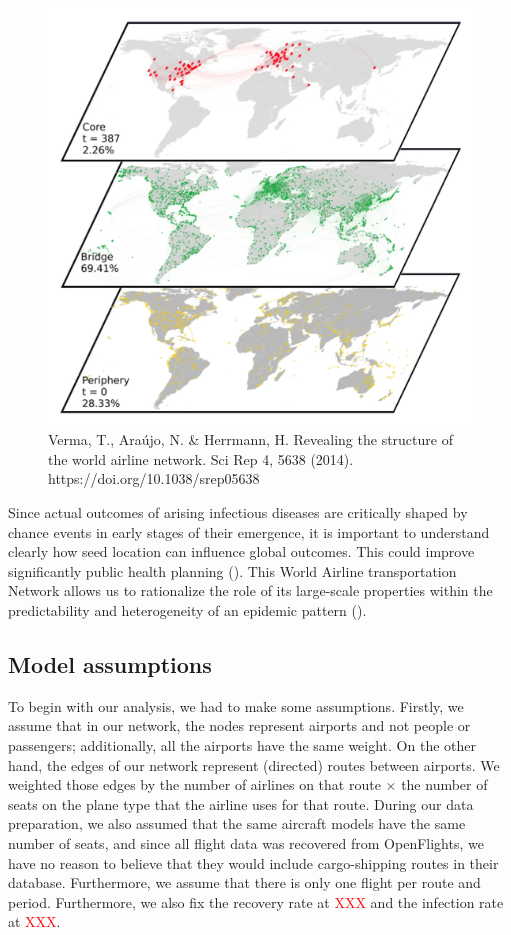\documentclass{Resources/netsci-project}
\begin{document}
\begin{figure}[!ht]
    \centering
    \includegraphics[scale=0.8]{Figures/layers.png}
    \caption{Verma, T., Araújo, N. \& Herrmann, H. Revealing the structure of the world airline network. Sci Rep 4, 5638 (2014). https://doi.org/10.1038/srep05638}
    \label{fig:layers}
\end{figure}
Since actual outcomes of arising infectious diseases are critically shaped by chance events in early stages of their emergence, it is important to understand clearly how seed location can influence global outcomes. This could improve significantly public health planning (\cite{Lawyer2016}). 
This World Airline transportation Network allows us to rationalize the role of its large-scale properties within the predictability and heterogeneity of an epidemic pattern (\cite{Colizza2006TheMO}). 


\subsection{Model assumptions}
To begin with our analysis, we had to make some assumptions. Firstly, we assume that in our network, the nodes represent airports and not people or passengers; additionally, all the airports have the same weight. On the other hand, the edges of our network represent (directed) routes between airports. We weighted those edges by the number of airlines on that route $\times$ the number of seats on the plane type that the airline uses for that route. During our data preparation, we also assumed that the same aircraft models have the same number of seats, and since all flight data was recovered from OpenFlights, we have no reason to believe that they would include cargo-shipping routes in their database. Furthermore, we assume that there is only one flight per route and period.
Furthermore, we also fix the recovery rate at \textcolor{red}{XXX} and the infection rate at \textcolor{red}{XXX}.
\end{document}
